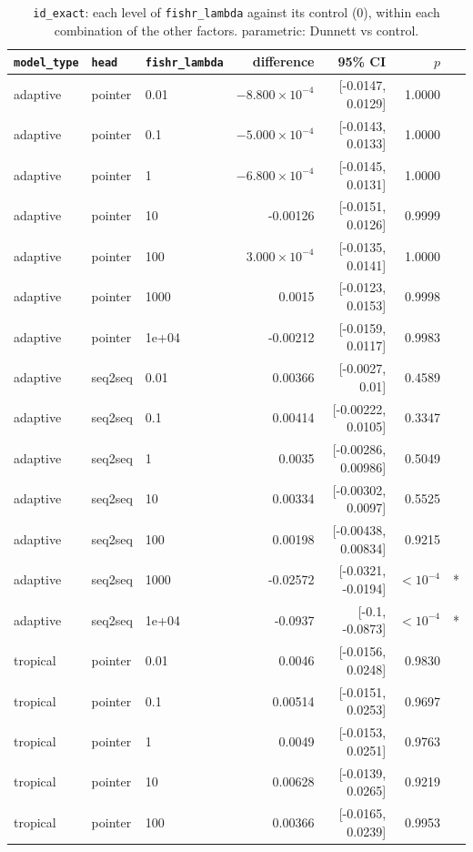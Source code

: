 \documentclass[10pt]{article}
\begin{document}
{\small
\begin{longtable}{lllrrrl}
\caption{\texttt{id\_exact}: each level of \texttt{fishr\_lambda} against its control (0), within each combination of the other factors. parametric: Dunnett vs control.}\label{tab:control-id_exact}\\
\toprule
\texttt{model\_type} & \texttt{head} & \texttt{fishr\_lambda} & difference & 95\% CI & $p$ & \\
\midrule
\endhead
adaptive & pointer & 0.01 & $-8.800\times10^{-4}$ & [-0.0147, 0.0129] & 1.0000 & \\
adaptive & pointer & 0.1 & $-5.000\times10^{-4}$ & [-0.0143, 0.0133] & 1.0000 & \\
adaptive & pointer & 1 & $-6.800\times10^{-4}$ & [-0.0145, 0.0131] & 1.0000 & \\
adaptive & pointer & 10 & -0.00126 & [-0.0151, 0.0126] & 0.9999 & \\
adaptive & pointer & 100 & $3.000\times10^{-4}$ & [-0.0135, 0.0141] & 1.0000 & \\
adaptive & pointer & 1000 & 0.0015 & [-0.0123, 0.0153] & 0.9998 & \\
adaptive & pointer & 1e+04 & -0.00212 & [-0.0159, 0.0117] & 0.9983 & \\
adaptive & seq2seq & 0.01 & 0.00366 & [-0.0027, 0.01] & 0.4589 & \\
adaptive & seq2seq & 0.1 & 0.00414 & [-0.00222, 0.0105] & 0.3347 & \\
adaptive & seq2seq & 1 & 0.0035 & [-0.00286, 0.00986] & 0.5049 & \\
adaptive & seq2seq & 10 & 0.00334 & [-0.00302, 0.0097] & 0.5525 & \\
adaptive & seq2seq & 100 & 0.00198 & [-0.00438, 0.00834] & 0.9215 & \\
adaptive & seq2seq & 1000 & -0.02572 & [-0.0321, -0.0194] & $<10^{-4}$ & *\\
adaptive & seq2seq & 1e+04 & -0.0937 & [-0.1, -0.0873] & $<10^{-4}$ & *\\
tropical & pointer & 0.01 & 0.0046 & [-0.0156, 0.0248] & 0.9830 & \\
tropical & pointer & 0.1 & 0.00514 & [-0.0151, 0.0253] & 0.9697 & \\
tropical & pointer & 1 & 0.0049 & [-0.0153, 0.0251] & 0.9763 & \\
tropical & pointer & 10 & 0.00628 & [-0.0139, 0.0265] & 0.9219 & \\
tropical & pointer & 100 & 0.00366 & [-0.0165, 0.0239] & 0.9953 & \\

\end{longtable}}
\end{document}
